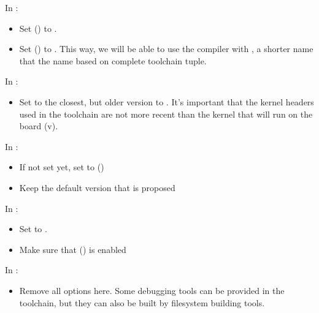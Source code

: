 In :
{
\begin{itemize}
\item Set  () to .
\item Set  () to
  .  This way, we will be able to use the compiler
  with , a shorter name that the name based on
  complete toolchain tuple.
\end{itemize}
}

In :
\begin{itemize}
\item Set  to the closest, but older version to
      \workingkernel. It's important that the kernel headers used in
      the toolchain are not more recent than the kernel that will run
      on the board (v\workingkernel).
\end{itemize}

In :
\begin{itemize}
  \item If not set yet, set  to 
        ()
  \item Keep the default version that is proposed
\end{itemize}

In :
\begin{itemize}
  \item Set  to .
  \item Make sure that  () is enabled
\end{itemize}

In :
\begin{itemize}
\item Remove all options here. Some debugging tools can be provided
      in the toolchain, but they can also be built by filesystem
      building tools.
\end{itemize}

